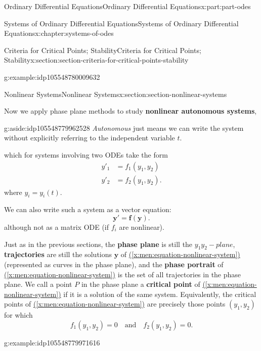 \documentclass[oneside,10pt,]{book}
\newcommand{\xreffont}{\relax}
\newcommand{\terminology}[1]{\textbf{#1}}
\numberwithin{equation}{part}
\renewcommand{\vec}[1]{\mathbf{#1}}
\newcommand{\amp}{&}
\begin{document}
\begin{partptx}{Ordinary Differential Equations}{}{Ordinary Differential Equations}{}{}{x:part:part-odes}
\begin{chapterptx}{Systems of Ordinary Differential Equations}{}{Systems of Ordinary Differential Equations}{}{}{x:chapter:systems-of-odes}
\begin{sectionptx}{Criteria for Critical Points; Stability}{}{Criteria for Critical Points; Stability}{}{}{x:section:section-criteria-for-critical-points-stability}
\begin{example}{}{g:example:idp105548780009632}
\end{example}
\end{sectionptx}
%
%
\typeout{************************************************}
\typeout{************************************************}
%
\begin{sectionptx}{Nonlinear Systems}{}{Nonlinear Systems}{}{}{x:section:section-nonlinear-systems}
\begin{introduction}{}%
Now we apply phase plane methods to study \terminology{nonlinear autonomous systems}, \begin{aside}{}{g:aside:idp105548779962528}%
\emph{Autonomous} just means we can write the system without explicitly referring to the independent variable \(t\).%
\end{aside}
 which for systems involving two ODEs take the form%
\begin{align*}
y'_{1} \amp = f_{1}(y_{1},y_{2})\\
y'_{2} \amp = f_{2}(y_{1},y_{2})\text{.}
\end{align*}
where \(y_{i} = y_{i}(t)\).%
\par
We can also write such a system as a vector equation:%
\begin{equation}
\vec{y}' = \vec{f}(\vec{y})\text{.}\label{x:men:equation-nonlinear-system}
\end{equation}
although not as a matrix ODE (if \(f_{i}\) are nonlinear).%
\par
Just as in the previous sections, the \terminology{phase plane} is still the \(y_{1}y_{2}-plane\), \terminology{trajectories} are still the solutions \(\vec{y}\) of \hyperref[x:men:equation-nonlinear-system]{({\xreffont\ref{x:men:equation-nonlinear-system}})} (represented as curves in the phase plane), and the \terminology{phase portrait} of \hyperref[x:men:equation-nonlinear-system]{({\xreffont\ref{x:men:equation-nonlinear-system}})} is the set of all trajectories in the phase plane. We call a point \(P\) in the phase plane a \terminology{critical point} of \hyperref[x:men:equation-nonlinear-system]{({\xreffont\ref{x:men:equation-nonlinear-system}})} if it is a solution of the same system. Equivalently, the critical points of \hyperref[x:men:equation-nonlinear-system]{({\xreffont\ref{x:men:equation-nonlinear-system}})} are precisely those points \((y_{1},y_{2})\) for which%
\begin{equation*}
f_{1}(y_{1},y_{2}) = 0\quad\text{and}\quad f_{2}(y_{1},y_{2}) = 0.  
\end{equation*}
%
\begin{example}{}{g:example:idp105548779971616}%

\end{example}
\end{introduction}
\end{sectionptx}
\end{chapterptx}
\end{partptx}
\end{document}
